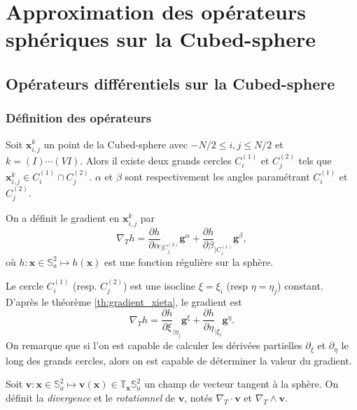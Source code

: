 
\chapter{Approximation des opérateurs sphériques sur la Cubed-sphere}

\section{Opérateurs différentiels sur la Cubed-sphere}

\subsection{Définition des opérateurs}
Soit $\mathbf{x}_{i,j}^k$ un point de la Cubed-sphere avec $- N/2 \leq i,j \leq N/2$ et $k = (I) \cdots (VI)$. Alors il existe deux grands cercles $C_i^{(1)}$ et $C_j^{(2)}$ tels que $\mathbf{x}_{i,j}^k \in C_i^{(1)} \cap C^{(2)}_j$. $\alpha$ et $\beta$ sont respectivement les angles paramétrant $C_i^{(1)}$ et $C_j^{(2)}$.

On a définit le gradient en $\mathbf{x}_{i,j}^k$ par 
\begin{equation}
\nabla_T h = \dfrac{\partial h}{\partial \alpha}_{|C^{(2)}_j} \mathbf{g}^{\alpha} + \dfrac{\partial h}{\partial \beta}_{|C^{(1)}_i} \mathbf{g}^{\beta},
\end{equation}
où $h : \mathbf{x} \in \mathbb{S}_a^2 \mapsto h(\mathbf{x})$ est une fonction régulière sur la sphère.

Le cercle $C_i^{(1)}$ (resp. $C_j^{(2)}$) est une isocline $\xi = \xi_i$ (resp $\eta = \eta_j$) constant. D'après le théorème \ref{th:gradient_xieta}, le gradient est 
\begin{equation}
\nabla_T h = \dfrac{\partial h}{\partial \xi}_{|\eta_j} \mathbf{g}^{\xi} + \dfrac{\partial h}{\partial \eta}_{|\xi_i} \mathbf{g}^{\eta}.
\end{equation}
On remarque que si l'on est capable de calculer les dérivées partielles $\partial_{\xi}$ et $\partial_{\eta}$ le long des grands cercles, alors on est capable de déterminer la valeur du gradient.

Soit $\mathbf{v} : \mathbf{x} \in \mathbb{S}_a^2 \mapsto \mathbf{v}(\mathbf{x}) \in \mathbb{T}_{\mathbf{x}} \mathbb{S}_a^2$ un champ de vecteur tangent à la sphère. On définit la \textit{divergence} et le \textit{rotationnel} de $\mathbf{v}$, notés $\nabla_T \cdot \mathbf{v}$ et $\nabla_T \wedge \mathbf{v}$.

